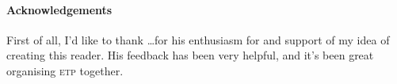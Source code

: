 \paragraph{Acknowledgements}
First of all,
I'd like to thank \dots for his enthusiasm for and support of my idea of creating this reader. %
His feedback has been very helpful,
and it's been great organising \textsc{etp} together.

